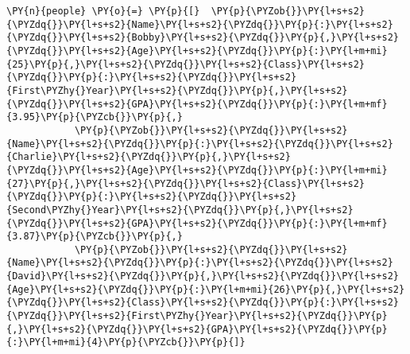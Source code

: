     \begin{tcolorbox}[breakable, size=fbox, boxrule=1pt, pad at break*=1mm,colback=cellbackground, colframe=cellborder]
\begin{Verbatim}[commandchars=\\\{\}]
\PY{n}{people} \PY{o}{=} \PY{p}{[}  \PY{p}{\PYZob{}}\PY{l+s+s2}{\PYZdq{}}\PY{l+s+s2}{Name}\PY{l+s+s2}{\PYZdq{}}\PY{p}{:}\PY{l+s+s2}{\PYZdq{}}\PY{l+s+s2}{Bobby}\PY{l+s+s2}{\PYZdq{}}\PY{p}{,}\PY{l+s+s2}{\PYZdq{}}\PY{l+s+s2}{Age}\PY{l+s+s2}{\PYZdq{}}\PY{p}{:}\PY{l+m+mi}{25}\PY{p}{,}\PY{l+s+s2}{\PYZdq{}}\PY{l+s+s2}{Class}\PY{l+s+s2}{\PYZdq{}}\PY{p}{:}\PY{l+s+s2}{\PYZdq{}}\PY{l+s+s2}{First\PYZhy{}Year}\PY{l+s+s2}{\PYZdq{}}\PY{p}{,}\PY{l+s+s2}{\PYZdq{}}\PY{l+s+s2}{GPA}\PY{l+s+s2}{\PYZdq{}}\PY{p}{:}\PY{l+m+mf}{3.95}\PY{p}{\PYZcb{}}\PY{p}{,}
            \PY{p}{\PYZob{}}\PY{l+s+s2}{\PYZdq{}}\PY{l+s+s2}{Name}\PY{l+s+s2}{\PYZdq{}}\PY{p}{:}\PY{l+s+s2}{\PYZdq{}}\PY{l+s+s2}{Charlie}\PY{l+s+s2}{\PYZdq{}}\PY{p}{,}\PY{l+s+s2}{\PYZdq{}}\PY{l+s+s2}{Age}\PY{l+s+s2}{\PYZdq{}}\PY{p}{:}\PY{l+m+mi}{27}\PY{p}{,}\PY{l+s+s2}{\PYZdq{}}\PY{l+s+s2}{Class}\PY{l+s+s2}{\PYZdq{}}\PY{p}{:}\PY{l+s+s2}{\PYZdq{}}\PY{l+s+s2}{Second\PYZhy{}Year}\PY{l+s+s2}{\PYZdq{}}\PY{p}{,}\PY{l+s+s2}{\PYZdq{}}\PY{l+s+s2}{GPA}\PY{l+s+s2}{\PYZdq{}}\PY{p}{:}\PY{l+m+mf}{3.87}\PY{p}{\PYZcb{}}\PY{p}{,}
            \PY{p}{\PYZob{}}\PY{l+s+s2}{\PYZdq{}}\PY{l+s+s2}{Name}\PY{l+s+s2}{\PYZdq{}}\PY{p}{:}\PY{l+s+s2}{\PYZdq{}}\PY{l+s+s2}{David}\PY{l+s+s2}{\PYZdq{}}\PY{p}{,}\PY{l+s+s2}{\PYZdq{}}\PY{l+s+s2}{Age}\PY{l+s+s2}{\PYZdq{}}\PY{p}{:}\PY{l+m+mi}{26}\PY{p}{,}\PY{l+s+s2}{\PYZdq{}}\PY{l+s+s2}{Class}\PY{l+s+s2}{\PYZdq{}}\PY{p}{:}\PY{l+s+s2}{\PYZdq{}}\PY{l+s+s2}{First\PYZhy{}Year}\PY{l+s+s2}{\PYZdq{}}\PY{p}{,}\PY{l+s+s2}{\PYZdq{}}\PY{l+s+s2}{GPA}\PY{l+s+s2}{\PYZdq{}}\PY{p}{:}\PY{l+m+mi}{4}\PY{p}{\PYZcb{}}\PY{p}{]}


\end{Verbatim}
\end{tcolorbox}
